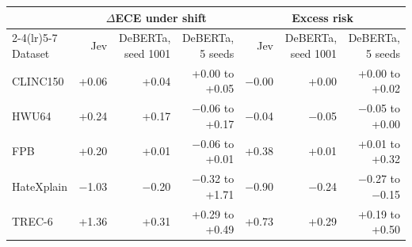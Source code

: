 \begin{tabular}{lrrrrrr}
\toprule
 & \multicolumn{3}{c}{$\Delta$ECE under shift} & \multicolumn{3}{c}{Excess risk} \\
\cmidrule(lr){2-4}\cmidrule(lr){5-7}
Dataset & Jev & DeBERTa, seed 1001 & DeBERTa, 5 seeds & Jev & DeBERTa, seed 1001 & DeBERTa, 5 seeds \\
\midrule
CLINC150 & +0.06 & +0.04 & +0.00 to +0.05 & $-$0.00 & +0.00 & +0.00 to +0.02 \\
HWU64 & +0.24 & +0.17 & $-$0.06 to +0.17 & $-$0.04 & $-$0.05 & $-$0.05 to +0.00 \\
FPB & +0.20 & +0.01 & $-$0.06 to +0.01 & +0.38 & +0.01 & +0.01 to +0.32 \\
HateXplain & $-$1.03 & $-$0.20 & $-$0.32 to +1.71 & $-$0.90 & $-$0.24 & $-$0.27 to $-$0.15 \\
TREC-6 & +1.36 & +0.31 & +0.29 to +0.49 & +0.73 & +0.29 & +0.19 to +0.50 \\
\bottomrule
\end{tabular}
